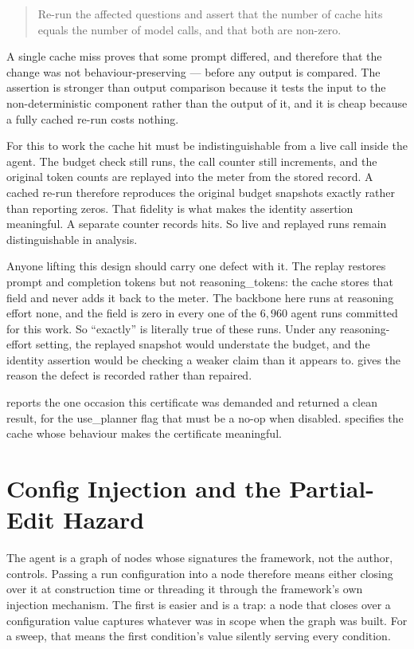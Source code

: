 \begin{quote}
Re-run the affected questions and assert that the number of cache hits equals
the number of model calls, and that both are non-zero.
\end{quote}

A single cache miss proves that some prompt differed, and therefore that the
change was not behaviour-preserving --- before any output is compared. The
assertion is stronger than output comparison because it tests the input to the
non-deterministic component rather than the output of it, and it is cheap
because a fully cached re-run costs nothing.

For this to work the cache hit must be indistinguishable from a live call inside
the agent. The budget check still runs, the call counter still increments, and
the original token counts are replayed into the meter from the stored record. A
cached re-run therefore reproduces the original budget snapshots exactly rather
than reporting zeros. That fidelity is what makes the identity assertion
meaningful. A separate counter records hits. So live and replayed runs remain
distinguishable in analysis.

Anyone lifting this design should carry one defect with it. The replay restores
prompt and completion tokens but not \textsf{reasoning\_tokens}: the cache
stores that field and never adds it back to the meter. The backbone here runs at
reasoning effort \textsf{none}, and the field is zero in every one of the
$6{,}960$ agent runs committed for this work. So ``exactly'' is literally true
of these runs. Under any reasoning-effort setting, the replayed snapshot would
understate the budget, and the identity assertion would be checking a weaker
claim than it appears to.  gives the reason the
defect is recorded rather than repaired.

 reports the one occasion this certificate was
demanded and returned a clean result, for the \textsf{use\_planner} flag that
must be a no-op when disabled.  specifies the cache
whose behaviour makes the certificate meaningful.

\section{Config Injection and the Partial-Edit
Hazard}\label{app:config-injection}

The agent is a graph of nodes whose signatures the framework, not the author,
controls. Passing a run configuration into a node therefore means either closing
over it at construction time or threading it through the framework's own
injection mechanism. The first is easier and is a trap: a node that closes over
a configuration value captures whatever was in scope when the graph was built.
For a sweep, that means the first condition's value silently serving every
condition.


